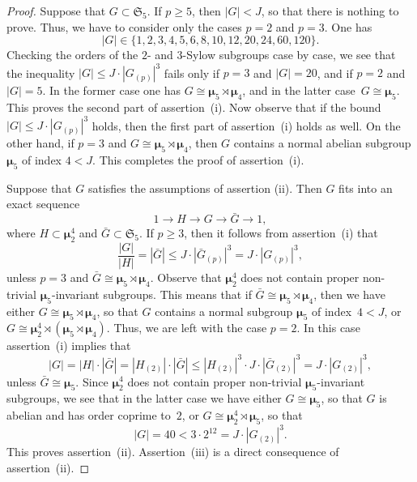 \documentclass[10pt,a4paper]{amsart}
\def \ge {\geqslant}
\def \le {\leqslant}
\newcommand{\mumu}{\boldsymbol{\mu}}
\begin{document}
\begin{proof}
Suppose that $G\subset \mathfrak{S}_5$. If $p\ge 5$, then $|G|<J$, so that
there is nothing to prove. Thus, we have to consider only the cases $p=2$ and $p=3$.
One has
$$
|G|\in\{1,2,3,4,5,6,8,10,12,20,24,60,120\}.
$$
Checking the orders of the $2$- and $3$-Sylow subgroups case by case, we see that the
inequality $|G|\le J\cdot |G_{(p)}|^3$ fails only if $p=3$ and $|G|=20$, and if
$p=2$ and~\mbox{$|G|=5$}. In the former case one has $G\cong\mumu_5\rtimes\mumu_4$,
and in the latter case~\mbox{$G\cong\mumu_5$}. This proves the second part of assertion~(i).
Now observe that if the bound~\mbox{$|G|\le J\cdot |G_{(p)}|^3$} holds, then the first part of assertion~(i)
holds as well. On the other hand, if $p=3$ and $G\cong\mumu_5\rtimes\mumu_4$, then
$G$ contains a normal abelian subgroup $\mumu_5$ of index $4<J$.
This completes the proof of assertion~(i).

Suppose that $G$ satisfies the assumptions of assertion (ii). Then $G$ fits into
an exact sequence
$$
1\to H\to G\to\bar{G}\to 1,
$$
where $H\subset \mumu_2^4$ and $\bar{G}\subset\mathfrak{S}_5$.
If $p\ge 3$, then it follows from assertion~(i) that
$$
\frac{|G|}{|H|}=|\bar{G}|\le J\cdot |\bar{G}_{(p)}|^3= J\cdot |G_{(p)}|^3,
$$
unless $p=3$ and $\bar{G}\cong\mumu_5\rtimes \mumu_4$. Observe that
$\mumu_2^4$ does not contain proper non-trivial $\mumu_5$-invariant subgroups.
This means that if $\bar{G}\cong\mumu_5\rtimes \mumu_4$, then we have either $G\cong\mumu_5\rtimes\mumu_4$, so that $G$ contains a normal subgroup $\mumu_5$
of index~\mbox{$4<J$}, or $G\cong\mumu_2^4\rtimes (\mumu_5\rtimes\mumu_4)$.
Thus, we are left with the case $p=2$.
In this case assertion~(i) implies that
$$
|G|=|H|\cdot |\bar{G}|=|H_{(2)}|\cdot |\bar{G}|\le |H_{(2)}|^3\cdot  J\cdot |\bar{G}_{(2)}|^3=
J\cdot |G_{(2)}|^3,
$$
unless $\bar{G}\cong \mumu_5$.
Since $\mumu_2^4$ does not contain proper non-trivial $\mumu_5$-invariant subgroups,
we see that in the latter case we have either $G\cong\mumu_5$, so that
$G$ is abelian and has order coprime to~$2$, or
$G\cong\mumu_2^4\rtimes \mumu_5$, so that
$$
|G|=40 < 3\cdot 2^{12}=J\cdot |G_{(2)}|^3.
$$
This proves assertion~(ii). Assertion~(iii) is a direct consequence of assertion~(ii).


\end{proof}
\end{document}
